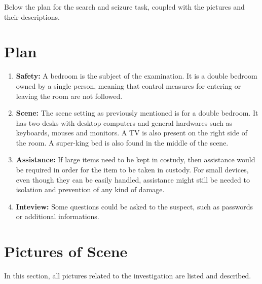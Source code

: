 Below the plan for the search and seizure task, coupled with the pictures and
their descriptions.

\section{Plan}
\label{s:scene-planning}

\begin{enumerate}
  \item \textbf{Safety:} A bedroom is the subject of the examination. It is a
  double bedroom owned by a single person, meaning that control measures for
  entering or leaving the room are not followed.
  \item \textbf{Scene:} The scene setting as previously mentioned is for a
  double bedroom. It has two desks with desktop computers and general hardwares
  such as keyboards, mouses and monitors. A TV is also present on the right side
  of the room. A super-king bed is also found in the middle of the scene.
  \item \textbf{Assistance:} If large items need to be kept in costudy, then
  assistance would be required in order for the item to be taken in custody. For
  small devices, even though they can be easily handled, assistance might still
  be needed to isolation and prevention of any kind of damage.
  \item \textbf{Inteview:} Some questions could be asked to the suspect, such
  as passwords or additional informations.
\end{enumerate}

\newpage
\section{Pictures of Scene}
\label{s:scene-pictures}
In this section, all pictures related to the investigation are listed and
described.

